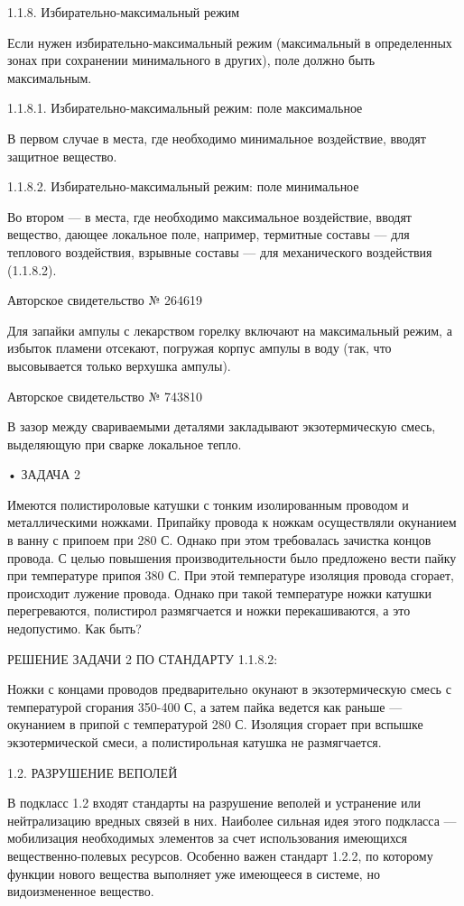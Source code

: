 1.1.8. Избирательно-максимальный режим

Если   нужен    избирательно-максимальный   режим    (максимальный   в
определенных зонах при сохранении  минимального в других), поле должно
быть максимальным.

1.1.8.1. Избирательно-максимальный режим: поле максимальное

В  первом  случае в  места,  где  необходимо минимальное  воздействие,
вводят защитное вещество.

1.1.8.2. Избирательно-максимальный режим: поле минимальное

Во втором —  в места, где необходимо  максимальное воздействие, вводят
вещество,  дающее  локальное  поле,   например,  термитные  составы  —
для  теплового  воздействия,  взрывные  составы  —  для  механического
воздействия (1.1.8.2).

Авторское свидетельство № 264619

Для  запайки  ампулы с  лекарством  горелку  включают на  максимальный
режим, а избыток пламени отсекают, погружая корпус ампулы в воду (так,
что высовывается только верхушка ампулы).

Авторское свидетельство № 743810

В зазор между свариваемыми деталями закладывают экзотермическую смесь,
выделяющую при сварке локальное тепло.


• ЗАДАЧА 2

Имеются  полистироловые  катушки  с тонким  изолированным  проводом  и
металлическими  ножками.   Припайку  провода  к   ножкам  осуществляли
окунанием в  ванну с припоем при  280 С. Однако при  этом требовалась
зачистка  концов провода.  С целью  повышения производительности  было
предложено  вести  пайку  при  температуре припоя  380  С.  При  этой
температуре  изоляция  провода  сгорает, происходит  лужение  провода.
Однако при  такой температуре ножки катушки  перегреваются, полистирол
размягчается и ножки перекашиваются, а это недопустимо. Как быть?


РЕШЕНИЕ ЗАДАЧИ 2 ПО СТАНДАРТУ 1.1.8.2:

Ножки  с концами  проводов  предварительно  окунают в  экзотермическую
смесь  с  температурой сгорания  350-400  С,  а затем  пайка  ведется
как  раньше —  окунанием  в  припой с  температурой  280 С.  Изоляция
сгорает при вспышке экзотермической смеси, а полистирольная катушка не
размягчается.

1.2. РАЗРУШЕНИЕ ВЕПОЛЕЙ

В подкласс 1.2 входят стандарты на разрушение веполей и устранение или
нейтрализацию  вредных  связей  в  них. Наиболее  сильная  идея  этого
подкласса —  мобилизация необходимых  элементов за  счет использования
имеющихся вещественно-полевых ресурсов. Особенно важен стандарт 1.2.2,
по которому функции нового вещества выполняет уже имеющееся в системе,
но видоизмененное вещество.

